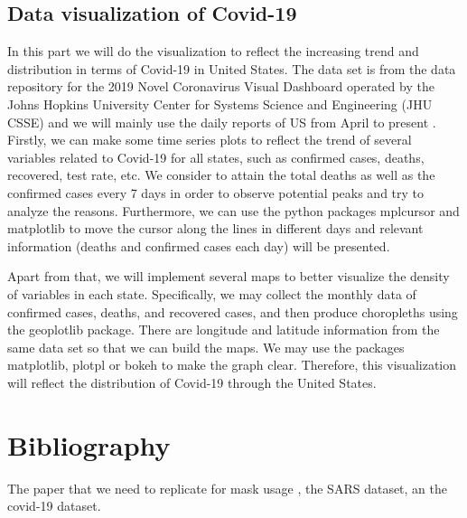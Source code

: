 \documentclass{article}
\begin{document}
\subsection{Data visualization of Covid-19}

In this part we will do the visualization to reflect the increasing trend and distribution in terms of Covid-19 in United States. The data set is from the data repository for the 2019 Novel Coronavirus Visual Dashboard operated by the Johns Hopkins University Center for Systems Science and Engineering (JHU CSSE) and we will mainly use the daily reports of US from April to present \cite{Johnhopkins}.
Firstly, we can make some time series plots to reflect the trend of several variables related to Covid-19 for all states, such as confirmed cases, deaths, recovered, test rate, etc. We consider to attain the total deaths as well as the confirmed cases every 7 days in order to observe potential peaks and try to analyze the reasons. Furthermore, we can use the python packages mplcursor and matplotlib to move the cursor along the lines in different days and relevant information (deaths and confirmed cases each day) will be presented.

Apart from that, we will implement several maps to better visualize the density of variables in each state. Specifically, we may collect the monthly data of confirmed cases, deaths, and recovered cases, and then produce choropleths using the geoplotlib package. There are longitude and latitude information from the same data set so that we can build the maps. We may use the packages matplotlib, plotpl or bokeh to make the graph clear. Therefore, this visualization will reflect the distribution of Covid-19 through the United States.



\section{Bibliography}
The paper that we need to replicate for mask usage \cite{Steff2020mask}, the SARS dataset\cite{SARSsource}, an the covid-19 dataset\cite{Johnhopkins}.

\printbibliography
\end{document}
